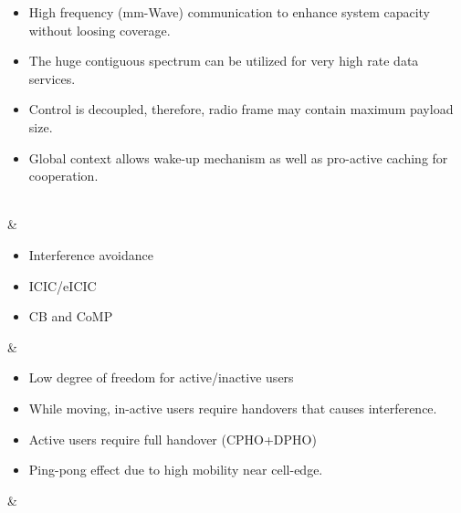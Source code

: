 \documentclass[article,10pt,twocolumn]{IEEEtran}
\begin{document}
\begin{table*}[!htb]
\begin{tcolorbox}[tab3,tabularx={>{\raggedright\arraybackslash}p{0.6in}||>{\raggedright\arraybackslash}p{1.3in}||X||X}]
\begin{itemize}[leftmargin=1.25em]
																																										\item High frequency (mm-Wave) communication to enhance system capacity without loosing coverage.
																																										\item The huge contiguous spectrum can be utilized for very high rate data services.
																																										\item Control is decoupled, therefore, radio frame may contain maximum payload size.
																																										\item Global context allows wake-up mechanism as well as pro-active caching for cooperation.
																																										\vspace*{-\baselineskip}
																																									\end{itemize}						\\ \hline 
{} 
											& \compress \begin{itemize}[leftmargin=1.25em]
												\renewcommand{\labelitemi}{$\Rightarrow$}
												\vspace*{6mm} 
												\item Interference avoidance
												\item ICIC/eICIC 
												\item CB and CoMP 
												\vspace*{-\baselineskip} 
											\end{itemize} 
																					&\compress\begin{itemize}[leftmargin=1.25em]
																						\renewcommand{\labelitemi}{$\Rightarrow$}
																						\item Low degree of freedom for active/inactive users
			     																			\item While moving, in-active users require handovers that causes interference.
			     																			\item Active users require full handover (CPHO+DPHO)
			     																			\item Ping-pong effect due to high mobility near cell-edge.
																						\vspace*{-\baselineskip}
																					\end{itemize}														
																																									& \compress\begin{itemize}[leftmargin=1.25em]
																																										\renewcommand{\labelitemi}{$\Rightarrow$}

\end{itemize}
\end{tcolorbox}
\end{table*}
\end{document}
